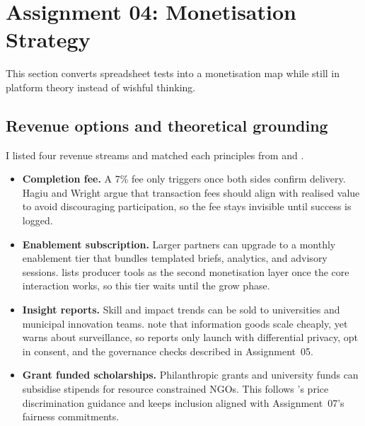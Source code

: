 \section*{Assignment 04: Monetisation Strategy}

This section converts spreadsheet tests into a monetisation map while still in platform theory instead of wishful thinking.

\subsection*{Revenue options and theoretical grounding}
I listed four revenue streams and matched each principles from \citet{Choudary2016} and \citet{HagiuWright2013}.
\begin{itemize}
  \item \textbf{Completion fee.} A 7\% fee only triggers once both sides confirm delivery. Hagiu and Wright argue that transaction fees should align with realised value to avoid discouraging participation, so the fee stays invisible until success is logged.
  \item \textbf{Enablement subscription.} Larger partners can upgrade to a monthly enablement tier that bundles templated briefs, analytics, and advisory sessions. \citet{Choudary2016} lists producer tools as the second monetisation layer once the core interaction works, so this tier waits until the grow phase.
  \item \textbf{Insight reports.} Skill and impact trends can be sold to universities and municipal innovation teams. \citet{ShapiroVarian1999} note that information goods scale cheaply, yet \citet{Zuboff2019} warns about surveillance, so reports only launch with differential privacy, opt in consent, and the governance checks described in Assignment~05.
  \item \textbf{Grant funded scholarships.} Philanthropic grants and university funds can subsidise stipends for resource constrained NGOs. This follows \citet{ShapiroVarian1999}'s price discrimination guidance and keeps inclusion aligned with Assignment~07's fairness commitments.
\end{itemize}

